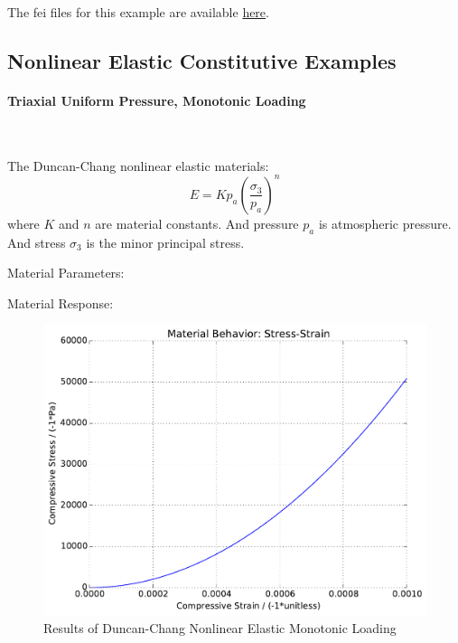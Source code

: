 \documentclass[fleqn,11pt]{article}
\begin{document}
The fei files for this example are available \href{https://github.com/yuan-energy/education_examples/tree/master/fei_examples/linear_elastic/4uniaxial_strain_cyclic_loading}{here}.

\newpage
\subsection{Nonlinear Elastic Constitutive Examples}

\paragraph{Triaxial Uniform Pressure, Monotonic Loading} ~

The Duncan-Chang nonlinear elastic materials:
\begin{equation}
  E = K p_a (\frac{\sigma_3}{p_a})^n
\end{equation}
where $K$ and $n$ are material constants. And pressure $p_a$ is atmospheric pressure. 
And stress $\sigma_3$ is the minor principal stress. 

Material Parameters:


Material Response:
\begin{figure}[H]
\begin{center}
\includegraphics[width=12cm]{../fei_examples/duncan_chang_nonlinear_elasticity/1triaxial_uniform_mono_loading/result.pdf}
\caption{
\label{Res_triaxial_nonlinear_elastic_mono}
Results of Duncan-Chang Nonlinear Elastic Monotonic Loading}
\end{center}
\end{figure}
\end{document}
